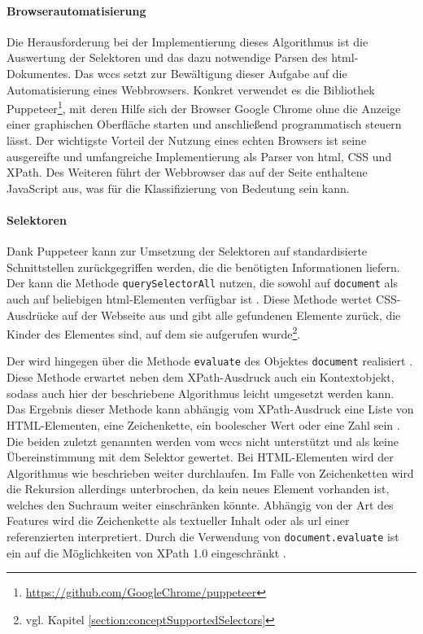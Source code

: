     \paragraph{Browserautomatisierung}
    Die Herausforderung bei der Implementierung dieses Algorithmus
    ist die Auswertung der Selektoren und das dazu notwendige Parsen des \gls{html}-Dokumentes.
    Das \gls{wccs} setzt zur Bewältigung dieser Aufgabe auf die Automatisierung eines Webbrowsers.
    Konkret verwendet es die Bibliothek
    Puppeteer\footnote{\url{https://github.com/GoogleChrome/puppeteer}},
    mit deren Hilfe sich der Browser Google Chrome ohne die Anzeige einer graphischen Oberfläche starten
    und anschließend programmatisch steuern lässt.
    Der wichtigste Vorteil der Nutzung eines echten Browsers ist seine ausgereifte und umfangreiche Implementierung
    als Parser von \gls{html}, CSS und XPath.
    Des Weiteren führt der Webbrowser das auf der Seite enthaltene JavaScript aus,
    was für die Klassifizierung von Bedeutung sein kann.

    \paragraph{Selektoren}
    Dank Puppeteer kann zur Umsetzung der Selektoren auf standardisierte Schnittstellen
    zurückgegriffen werden, die die benötigten Informationen liefern.
    Der {\cssSelector} kann die Methode \texttt{querySelectorAll} nutzen,
    die sowohl auf \texttt{document} als auch auf beliebigen \gls{html}-Elementen verfügbar ist
    \cite[Kapitel 6.1]{w3c:selectorsAPI}.
    Diese Methode wertet CSS-Ausdrücke auf der Webseite aus und gibt alle gefundenen Elemente zurück,
    die Kinder des Elementes sind, auf dem sie aufgerufen
    wurde\footnote{vgl. Kapitel \ref{section:conceptSupportedSelectors}}.

    Der {\xpathSelector} wird hingegen über die Methode \texttt{evaluate} des Objektes \texttt{document} realisiert
    \cite[Kapitel 1.4]{w3c:domXPath}.
    Diese Methode erwartet neben dem XPath-Ausdruck auch ein Kontextobjekt,
    sodass auch hier der beschriebene Algorithmus leicht umgesetzt werden kann.
    Das Ergebnis dieser Methode kann abhängig vom XPath-Ausdruck eine Liste von HTML-Elementen, eine Zeichenkette,
    ein boolescher Wert oder eine Zahl sein
    \cite[Kapitel 1.4]{w3c:domXPath}.
    Die beiden zuletzt genannten werden vom \gls{wccs} nicht unterstützt und als keine Übereinstimmung mit dem Selektor gewertet.
    Bei HTML-Elementen wird der Algorithmus wie beschrieben weiter durchlaufen.
    Im Falle von Zeichenketten wird die Rekursion allerdings unterbrochen, da kein neues Element vorhanden ist,
    welches den Suchraum weiter einschränken könnte.
    Abhängig von der Art des Features wird die Zeichenkette als textueller Inhalt
    oder als \gls{url} einer referenzierten {\resource} interpretiert.
    Durch die Verwendung von \texttt{document.evaluate} ist ein {\xpathSelector}
    auf die Möglichkeiten von XPath 1.0 eingeschränkt \cite{w3c:domXPath}.

